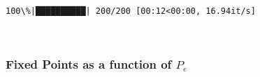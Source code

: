 \documentclass[11pt]{article}
\begin{document}
    \begin{Verbatim}[commandchars=\\\{\}]
100\%|██████████| 200/200 [00:12<00:00, 16.94it/s]
    \end{Verbatim}

    \begin{center}
    \end{center}
    { \hspace*{\fill} \\}
    
    \hypertarget{fixed-points-as-a-function-of-p_e}{%
\subsubsection{\texorpdfstring{Fixed Points as a function of
\(P_e\)}{Fixed Points as a function of P\_e}}\label{fixed-points-as-a-function-of-p_e}}
\end{document}
